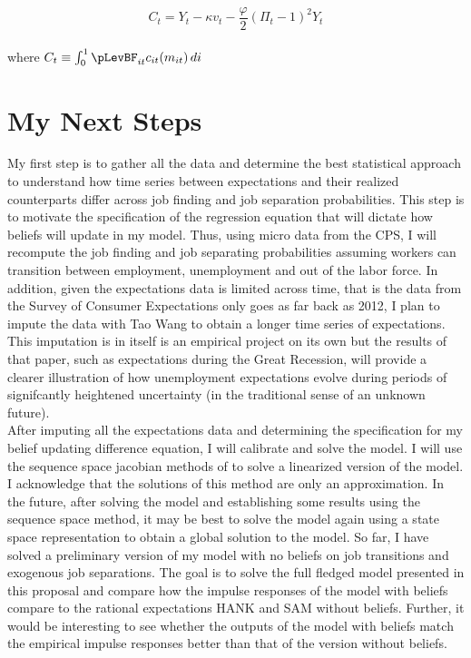 \documentclass[titlepage]{\econtex}\providecommand{\texname}{Dissertation-Proposal}
\begin{document}
$$ C_{t} = Y_{t}  - \kappa v_{t} - \frac{\varphi}{2}\left( \Pi_{t}  - 1 \right)^{2} Y_{t}   $$\\

 
 where $C_{t} \equiv  \int_{0}^{1} \pLevBF_{it} c_{it}(m_{it})\, di $ \\




\hypertarget{My Next Steps }{}
\section{My Next Steps }


My first step is to gather all the data and determine the best statistical approach to understand how time series between expectations and their realized counterparts differ across job finding and job separation probabilities. This step is to motivate the specification of the regression equation that will dictate how beliefs will update in my model. Thus, using micro data from the CPS, I will recompute the job finding and job separating probabilities assuming workers can transition between employment, unemployment and out of the labor force. In addition, given the expectations data is limited across time, that is the data from the Survey of Consumer Expectations only goes as far back as 2012, I plan to impute the data with Tao Wang to obtain a longer time series of expectations. This imputation is in itself is an empirical project on its own but the results of that paper, such as expectations during the Great Recession, will provide a clearer illustration of how unemployment expectations evolve during periods of signifcantly heightened uncertainty (in the traditional sense of an unknown future). \\

After imputing all the expectations data and determining the specification for my belief updating difference equation, I will calibrate and solve the model. I will use the sequence space jacobian methods of \cite{auclert2021using} to solve a linearized version of the model. I acknowledge that the solutions of this method are only an approximation. In the future, after solving the model and establishing some results using the sequence space method, it may be best to solve the model again using a state space representation to obtain a global solution to the model. So far, I have solved a preliminary version of my model with no beliefs on job transitions and exogenous job separations. The goal is to solve the full fledged model presented in this proposal and compare how the impulse responses of the model with beliefs compare to the rational expectations HANK and SAM without beliefs. Further, it would be interesting to see whether the outputs of the model with beliefs match the empirical impulse responses better than that of the version without beliefs. 
\end{document}
